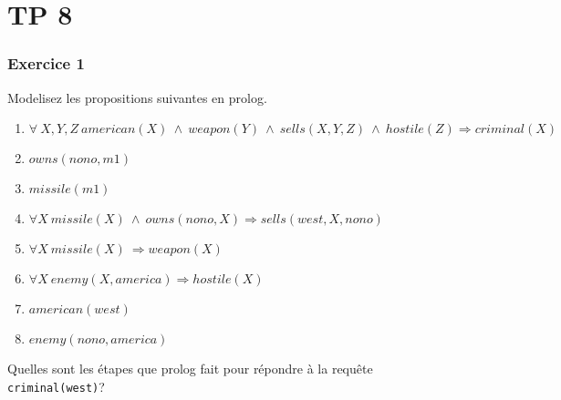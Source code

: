 \chapter*{TP 8}



% 
% 

\subsection*{Exercice 1}
Modelisez les propositions suivantes en prolog.
\footnotesize
\begin{enumerate}
\item $\forall \ X, Y, Z \ american(X) \ \wedge \ weapon(Y) \ \wedge \ sells(X, Y, Z) \ \wedge \ hostile(Z) \Rightarrow criminal(X)$
\item $owns(nono, m1)$
\item $missile(m1)$
\item $\forall X \ missile(X) \ \wedge \ owns(nono, X) \Rightarrow sells(west, X, nono)$
\item $\forall X \ missile(X) \ \Rightarrow weapon(X)$
\item $\forall X \ enemy(X, america) \Rightarrow hostile(X)$
\item $american(west)$
\item $enemy(nono, america)$
\end{enumerate}
\normalsize
Quelles sont les \'{e}tapes que prolog fait pour r\'{e}pondre \`{a} la requ\^{e}te \texttt{criminal(west)}?

